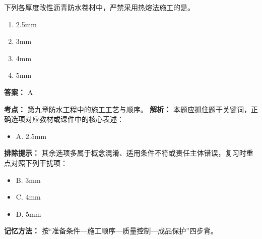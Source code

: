\documentclass[UTF8,fontset=fandol,11pt]{ctexart}
\begin{document}
\begin{quizbox}[title={第 5 题}]
下列各厚度改性沥青防水卷材中，严禁采用热熔法施工的是。\\
\begin{enumerate}[label=\Alph*.]
\item 2.5mm
\item 3mm
\item 4mm
\item 5mm
\end{enumerate}
\textbf{答案：} A
\vspace{0.25em}
\begin{answerbox}[title={考点解析}]
\textbf{考点：} 第九章防水工程中的施工工艺与顺序。
\textbf{解析：} 本题应抓住题干关键词，正确选项对应教材或课件中的核心表述：
\begin{itemize}
\item A. 2.5mm
\end{itemize}
\textbf{排除提示：} 其余选项多属于概念混淆、适用条件不符或责任主体错误，复习时重点对照下列干扰项：
\begin{itemize}
\item B. 3mm
\item C. 4mm
\item D. 5mm
\end{itemize}
\textbf{记忆方法：} 按“准备条件—施工顺序—质量控制—成品保护”四步背。
\end{answerbox}
\end{quizbox}

\vspace{0.2em}
\end{document}
